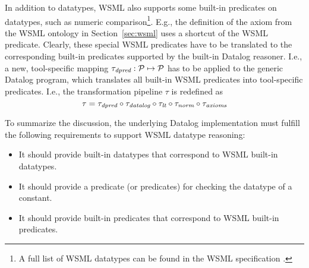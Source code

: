 In addition to datatypes, WSML also supports some built-in predicates on datatypes, such as
numeric comparison\footnote{A full list of WSML datatypes can be
found in the WSML specification \cite{wsml-spec}.}. E.g., the
definition of the  axiom from the WSML ontology in Section~\ref{sec:wsml} uses a shortcut of the WSML  predicate. Clearly, these special WSML
predicates have to be translated to the corresponding built-in
predicates supported by the built-in Datalog reasoner. I.e., a new, tool-specific
mapping $\tau_{\textit{\scriptsize{dpred}}} : \mathcal{P} \mapsto \mathcal{P}$ has to be applied to the generic Datalog program, which translates all built-in WSML predicates into tool-specific predicates. I.e., the transformation pipeline $\tau$ is redefined as
\begin{displaymath}
    \tau = \tau_{\textit{\scriptsize{dpred}}} \circ \tau_{\textit{\scriptsize{datalog}}} \circ \tau_{\textit{\scriptsize{lt}}} \circ \tau_{\textit{\scriptsize{norm}}} \circ \tau_{\textit{\scriptsize{axioms}}}
\end{displaymath}

To summarize the discussion, the underlying Datalog implementation
must fulfill the following requirements to support WSML datatype
reasoning:
\begin{itemize}
    \item It should provide built-in datatypes that correspond to WSML built-in datatypes.
    \item It should provide a predicate (or predicates) for checking the datatype of a constant.
    \item It should provide built-in predicates that correspond to WSML built-in predicates.
\end{itemize}

